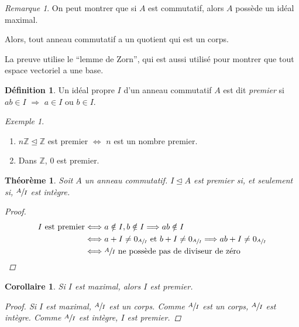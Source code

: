 \documentclass{report}
\newtheorem*{thm}{Th\'eor\`eme}
\newtheorem*{coro}{Corollaire}
\theoremstyle{definition}
\newtheorem*{dfn}{D\'efinition}
\theoremstyle{remark}
\newtheorem*{exem}{Exemple}
\newtheorem*{rmq}{Remarque}
\def\ZZ{\mathbb{Z}}
\begin{document}
	\begin{rmq}
		On peut montrer que si $A$ est commutatif, alors $A$ poss\`ede un id\'eal maximal.

		Alors, tout anneau commutatif a un quotient qui est un corps.

		La preuve utilise le ``lemme de Zorn'', qui est aussi utilis\'e pour montrer que tout espace vectoriel a une base.
	\end{rmq}

	\begin{dfn}
		Un id\'eal propre $I$ d'un anneau commutatif $A$ est dit \emph{premier} si $ab\in I$ $\Longrightarrow$ $a\in I$ ou $b\in I$.
	\end{dfn}

	\begin{exem}
		\begin{enumerate}
			\item $n\ZZ\trianglelefteq\ZZ$ est premier $\Longleftrightarrow$ $n$ est un nombre premier.
			\item Dans $\ZZ$, $0$ est premier.
		\end{enumerate}
	\end{exem}

	\begin{thm}
		Soit $A$ un anneau commutatif. $I\trianglelefteq A$ est premier si, et seulement si, $\sfrac{A}{I}$ est int\`egre.
		\begin{proof}
			\begin{align*}
				I \text{ est premier}&\Longleftrightarrow a\notin I,b\notin I \Longrightarrow ab\notin I\\
				&\Longleftrightarrow a+I\neq0_{\sfrac{A}{I}} \text{ et } b+I\neq0_{\sfrac{A}{I}} \Longrightarrow ab+I\neq0_{\sfrac{A}{I}}\\
				&\Longleftrightarrow \sfrac{A}{I} \text{ ne poss\`ede pas de diviseur de z\'ero}
			\end{align*}
		\end{proof}
	\end{thm}

	\begin{coro}
		Si $I$ est maximal, alors $I$ est premier.
		\begin{proof}
			Si $I$ est maximal, $\sfrac{A}{I}$ est un corps. Comme $\sfrac{A}{I}$ est un corps, $\sfrac{A}{I}$ est int\`egre. Comme $\sfrac{A}{I}$ est int\`egre, $I$ est premier.
		\end{proof}
	\end{coro}
\end{document}

